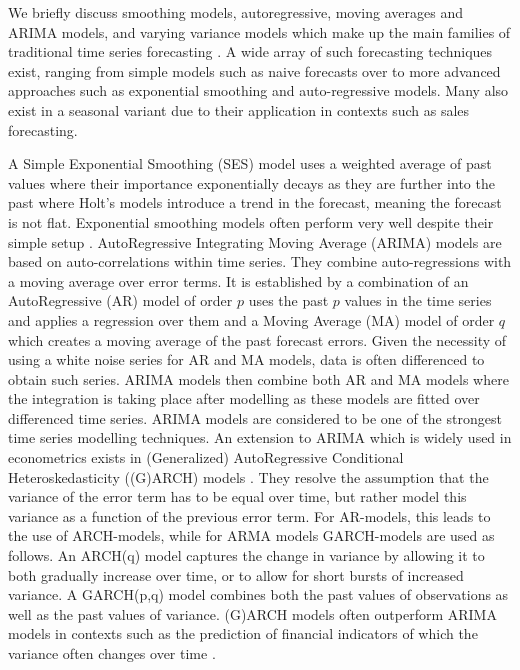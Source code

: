We briefly discuss smoothing models, autoregressive, moving averages and ARIMA models, and varying variance models which make up the main families of traditional time series forecasting \cite{hyndman2018forecasting}.
A wide array of such forecasting techniques exist, ranging from simple models such as naive forecasts over to more advanced approaches such as exponential smoothing and auto-regressive models.
Many also exist in a seasonal variant due to their application in contexts such as sales forecasting.

A Simple Exponential Smoothing (SES) model uses a weighted average of past values where their importance exponentially decays as they are further into the past where Holt's models introduce a trend in the forecast, meaning the forecast is not flat.
Exponential smoothing models often perform very well despite their simple setup \cite{makridakis2018statistical}.
AutoRegressive Integrating Moving Average (ARIMA) models are based on auto-correlations within time series. 
They combine auto-regressions with a moving average over error terms.
It is established by a combination of an AutoRegressive (AR) model of order $p$ uses the past $p$ values in the time series and applies a regression over them and a Moving Average (MA) model of order $q$ which creates a moving average of the past forecast errors.
Given the necessity of using a white noise series for AR and MA models, data is often differenced to obtain such series.
ARIMA models then combine both AR and MA models where the integration is taking place after modelling as these models are fitted over differenced time series.
ARIMA models are considered to be one of the strongest time series modelling techniques.
An extension to ARIMA which is widely used in econometrics exists in (Generalized) AutoRegressive Conditional Heteroskedasticity ((G)ARCH) models \cite{francq2019garch}.
They resolve the assumption that the variance of the error term has to be equal over time, but rather model this variance as a function of the previous error term.
For AR-models, this leads to the use of ARCH-models, while for ARMA models GARCH-models are used as follows.
An ARCH(q) model captures the change in variance by allowing it to both gradually increase over time, or to allow for short bursts of increased variance.
A GARCH(p,q) model combines both the past values of observations as well as the past values of variance.
(G)ARCH models often outperform ARIMA models in contexts such as the prediction of financial indicators of which the variance often changes over time \cite{francq2019garch}.








